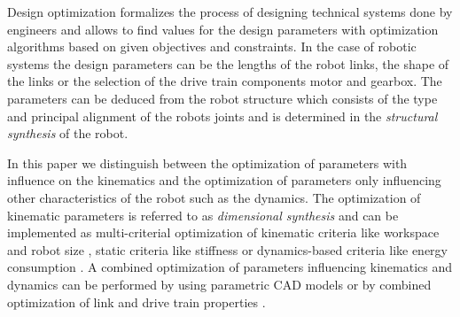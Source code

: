 \documentclass{svproc}
\begin{document}
Design optimization formalizes the process of designing technical systems done by engineers and allows to find values for the design parameters with optimization algorithms based on given objectives and constraints.
In the case of robotic systems the design parameters can be the lengths of the robot links, the shape of the links or the selection of the drive train components motor and gearbox.
The parameters can be deduced from the robot structure which consists of the type and principal alignment of the robots joints and is determined in the \emph{structural synthesis} of the robot.

In this paper we distinguish between the optimization of parameters with influence on the kinematics and the optimization of parameters only influencing other characteristics of the robot such as the dynamics.
The optimization of kinematic parameters is referred to as \emph{dimensional synthesis} and can be implemented as multi-criterial optimization of kinematic criteria like workspace and robot size \cite{CeccarelliLan2004}, static criteria like stiffness \cite{CarboneOttCec2007} or dynamics-based criteria like energy consumption \cite{RamirezKotOrt2017}.
A combined optimization of parameters influencing kinematics and dynamics can be performed by using parametric CAD models \cite{TarkianLunOel2008,ZhouBai2015} or by combined optimization of link and drive train properties \cite{ShillerSun1991}.

\end{document}
